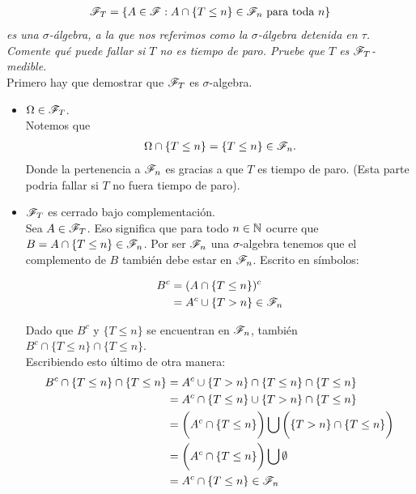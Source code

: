 \emph{
	\begin{align}
		\mathscr{F}_T=\left\{ A\in\mathscr{F}:A\cap\left\{ T\leq n\right\} \in\mathscr{F}_n\text{ para toda } n\right\} 
	\end{align}
	es una $\sigma$-\'algebra, 
	a la que nos referimos como la $\sigma$-\'algebra detenida en $\tau$. Comente qu\'e puede fallar si $T$ no es tiempo de paro. 
	Pruebe que $T$ es $\mathscr{F}_T$-medible.\\		
}			
\afterstatement		
	Primero hay que demostrar que $\mathscr{F}_T$ es $\sigma$-algebra.\\
	
	\begin{itemize}
		\item $\Omega \in \mathscr{F}_T$. \\
		
			Notemos que 
			\begin{align}
				\Omega \cap \{T \leq n\} = \{T \leq n\} \in \mathscr{F}_n.
			\end{align}
			Donde la pertenencia a $\mathscr{F}_n$ es gracias a que $T$ es tiempo de paro. (Esta parte podria fallar si 
			$T$ no fuera tiempo de paro).\\
		
		\item $\mathscr{F}_T$ es cerrado bajo complementación.\\
		
			Sea $A \in \mathscr{F}_T$. Eso significa que para todo $n \in  \mathbb{N}$ ocurre que $B = A \cap \{ T \leq n \} \in \mathscr{F}_n$. 
			Por ser $\mathscr{F}_n$ una $\sigma$-algebra tenemos que el complemento de $B$ también debe estar en $\mathscr{F}_n$. 
			Escrito en símbolos:
			
			\begin{align}
				B^c 	&= (A   \cap \{ T \leq n \})^c \\
						&=  A^c \cup \{ T > n \} \in \mathscr{F}_n
			\end{align}
			
			Dado que $B^c$ y $\{ T \leq n \}$ se encuentran en $\mathscr{F}_n$, también \\
			$B^c \cap \{ T \leq n \} \cap \{ T \leq n \}$.\\
			
			Escribiendo esto último de otra manera:
			\begin{align}
				B^c \cap \{ T \leq n \} \cap \{ T \leq n \} 	&=		A^c \cup \{ T > n \} \cap \{ T \leq n \} \cap \{ T \leq n \} \\
																&= 		A^c \cap \{ T \leq n \} \cup \{ T > n \} \cap \{ T \leq n \} \\
																&= 		\bigg(A^c \cap \{ T \leq n \}\bigg) 
																			\bigcup 
																		\bigg(\{ T > n \} \cap \{ T \leq n \}\bigg) \\
																&=		\bigg(A^c \cap \{ T \leq n \}\bigg)	\bigcup \emptyset \\
																&=		A^c \cap \{ T \leq n \} \in \mathscr{F}_n
			\end{align}
			

\end{itemize}
